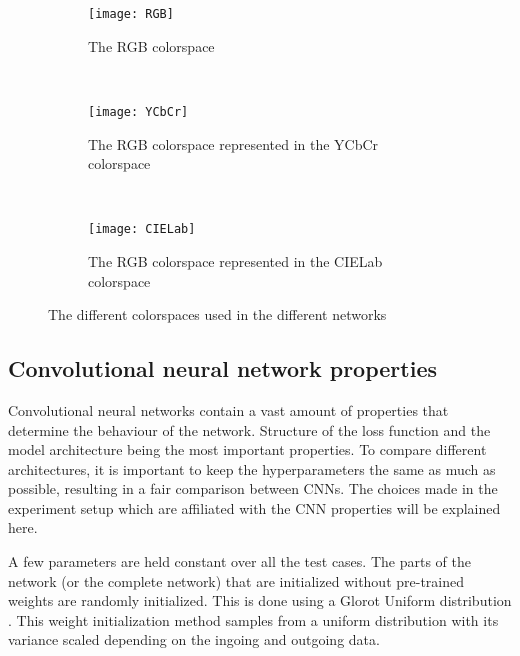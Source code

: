 \begin{figure}
	\centering
	\begin{subfigure}[b]{0.32\textwidth}
		\texttt{[image: RGB]}
		\caption{The RGB colorspace}
		\label{fig:RGB}
	\end{subfigure}
	~ %
	\begin{subfigure}[b]{0.32\textwidth}
		\texttt{[image: YCbCr]}
		\caption{The RGB colorspace represented in the YCbCr colorspace}
		\label{fig:YCbCr}
	\end{subfigure}
	~ %
	\begin{subfigure}[b]{0.32\textwidth}
		\texttt{[image: CIELab]}
		\caption{The RGB colorspace represented in the CIELab colorspace}
		\label{fig:CIELab}
	\end{subfigure}
	\caption{The different colorspaces used in the different networks}\label{fig:animals}
\end{figure}

\subsection{Convolutional neural network properties}
\label{sec:nnproperties}

Convolutional neural networks contain a vast amount of properties that determine the behaviour of the network. Structure of the loss function and the model architecture being the most important properties. To compare different architectures, it is important to keep the hyperparameters the same as much as possible, resulting in a fair comparison between CNNs. The choices made in the experiment setup which are affiliated with the CNN properties will be explained here.

A few parameters are held constant over all the test cases. The parts of the network (or the complete network) that are initialized without pre-trained weights are randomly initialized. This is done using a Glorot Uniform distribution \cite{Glorot}. This weight initialization method samples from a uniform distribution with its variance scaled depending on the ingoing and outgoing data. 


